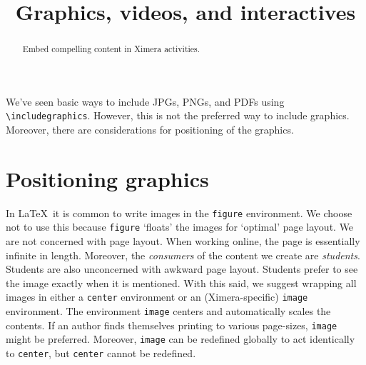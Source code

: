 \documentclass{ximera}
\title{Graphics, videos, and interactives}
\begin{document}
\begin{abstract}
  Embed compelling content in Ximera activities.
\end{abstract}
\maketitle

We've seen basic ways to include JPGs, PNGs, and PDFs using
\verb!\includegraphics!. However, this is not the preferred way to include
graphics. Moreover, there are considerations for positioning of the graphics.

\section{Positioning graphics}

In \LaTeX\ it is common to write images in the \verb!figure! environment. We
choose not to use this because \verb!figure! `floats' the images for `optimal'
page layout. We are not concerned with page layout. When working online, the
page is essentially infinite in length. Moreover, the \textit{consumers} of the
content we create are \textit{students}. Students are also unconcerned with
awkward page layout. Students prefer to see the image exactly when it is
mentioned. With this said, we suggest wrapping all images in either a
\verb!center! environment or an (Ximera-specific) \verb!image! environment.
The environment \verb!image! centers and automatically scales the contents.  If
an author finds themselves printing to various page-sizes, \verb!image! might
be preferred. Moreover, \verb!image! can be redefined globally to act
identically to \verb!center!, but \verb!center! cannot be redefined.
\end{document}
